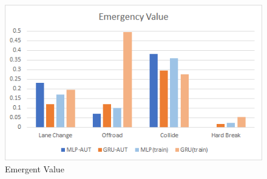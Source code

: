 \begin{figure}[H]
\begin{center}
\includegraphics[width=14cm]{./figures/graph_emergency.png}
\caption{Emergent Value}
\label{fig:graph_emergency}
\end{center}
\end{figure}
